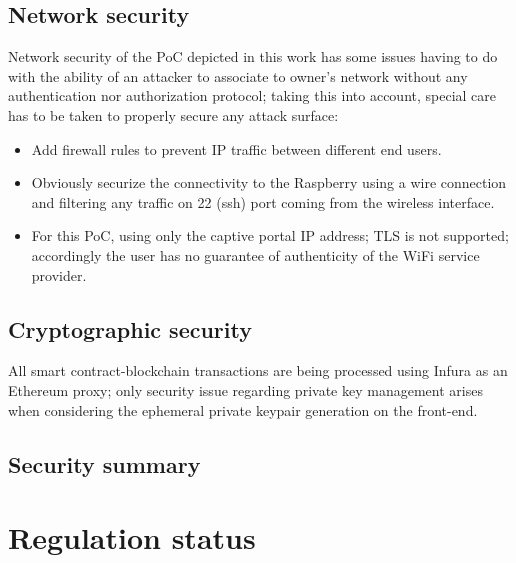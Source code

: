 \documentclass[12pt]{amsart}
\begin{document}
\begin{multicols}{2}
\subsection{Network security}

\vspace{0.35cm}

Network security of the PoC depicted in this work
has some issues having to do with the ability of
an attacker to associate to owner's network without
any authentication nor authorization protocol; taking
this into account, special care has to be taken to
properly secure any attack surface:

\begin{itemize}
\item Add firewall rules to prevent IP traffic between
  different end users.
\item Obviously securize the connectivity to the Raspberry
  using a wire connection and filtering any traffic on 22 (ssh)
  port coming from the wireless interface.
\item For this PoC, using only the captive portal IP address; TLS
  is not supported; accordingly the user has no guarantee of
  authenticity of the WiFi service provider.
\end{itemize}

\subsection{Cryptographic security}

\vspace{0.35cm}

All smart contract-blockchain transactions are being processed
using Infura as an Ethereum proxy; only security issue regarding
private key management arises when considering the ephemeral
private keypair generation on the front-end.

\subsection{Security summary}

\vspace{0.35cm}



\section{Regulation status}
\vspace{0.35cm}


\end{multicols}
\end{document}

